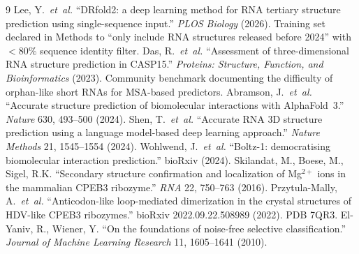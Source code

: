 \documentclass[11pt,a4paper]{article}
\begin{document}
\begin{thebibliography}{9}\small
{} Lee, Y.~\textit{et~al.} ``DRfold2: a deep
learning method for RNA tertiary structure prediction using
single-sequence input.'' \textit{PLOS Biology} (2026). Training set
declared in Methods to ``only include RNA structures released
before 2024'' with $<80\%$ sequence identity filter.
 Das, R.~\textit{et~al.} ``Assessment of three-dimensional
RNA structure prediction in CASP15.'' \textit{Proteins:
Structure, Function, and Bioinformatics} (2023). Community
benchmark documenting the difficulty of orphan-like short RNAs
for MSA-based predictors.
 Abramson, J.~\textit{et~al.} ``Accurate structure
prediction of biomolecular interactions with AlphaFold~3.''
\textit{Nature} 630, 493--500 (2024).
 Shen, T.~\textit{et~al.} ``Accurate RNA 3D
structure prediction using a language model-based deep learning
approach.'' \textit{Nature Methods} 21, 1545--1554 (2024).
 Wohlwend, J.~\textit{et~al.} ``Boltz-1:
democratising biomolecular interaction prediction.'' bioRxiv (2024).
 Skilandat, M., Boese, M., Sigel, R.K.
``Secondary structure confirmation and localization of Mg$^{2+}$
ions in the mammalian CPEB3 ribozyme.'' \textit{RNA} 22, 750--763 (2016).
 Przytula-Mally, A.~\textit{et~al.}
``Anticodon-like loop-mediated dimerization in the crystal structures
of HDV-like CPEB3 ribozymes.'' bioRxiv 2022.09.22.508989 (2022).
PDB 7QR3.
 El-Yaniv, R., Wiener, Y. ``On the foundations
of noise-free selective classification.'' \emph{Journal of Machine
Learning Research} 11, 1605--1641 (2010).
\end{thebibliography}
\end{document}
